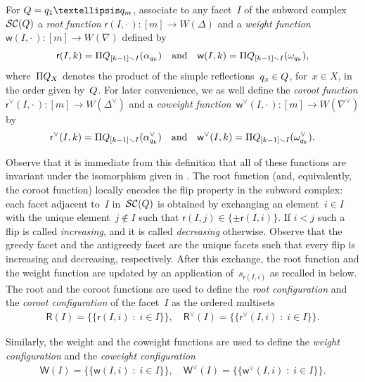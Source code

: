 \documentclass[10pt]{amsart}
\theoremstyle{definition}\newtheorem{rema}[theo]{Remark}\newtheorem{exem}[theo]{Example}
\newcommand{\ssm}{\smallsetminus}
\newcommand{\Dfn}[1]{\emph{#1}}
\newcommand{\subwordComplex}{\mathcal{SC}}
\newcommand{\sq}[1]{{\rm #1}}
\newcommand{\Q}{\sq{Q}}
\newcommand{\q}{\sq{q}}
\newcommand{\sfr}{\mathsf{r}}
\newcommand{\sfR}{\mathsf{R}}
\newcommand{\sfw}{\mathsf{w}}
\newcommand{\sfW}{\mathsf{W}}
\newcommand{\Root}[2]{{\sfr}(#1,#2)}
\newcommand{\Roots}[1]{{\sfR}(#1)}
\newcommand{\Weight}[2]{{\sfw}(#1,#2)}
\newcommand{\Weights}[1]{{\sfW}(#1)}
\newcommand{\coRoot}[2]{{\sfr^\vee}(#1,#2)}
\newcommand{\coRoots}[1]{{\sfR^\vee}(#1)}
\newcommand{\coWeight}[2]{{\sfw^\vee}(#1,#2)}
\newcommand{\coWeights}[1]{{\sfW^\vee}(#1)}
\newcommand{\bigmultiset}[2]{\big\{\!\!\big\{ #1 \;:\; #2 \big\}\!\!\big\}}
\newcommand{\wordprod}[2]{\Pi{#1}_{#2}}
\begin{document}
For $\Q = \q_1 \dots \q_m$, associate to any facet~$I$ of the subword complex~$\subwordComplex(\Q)$ a \Dfn{root function} $\Root{I}{\cdot\,} : [m] \to W(\Delta)$ and a \Dfn{weight function}~$\Weight{I}{\cdot\,} : [m] \to W(\nabla)$ defined by
\[
\Root{I}{k} = \wordprod{\Q}{[k-1] \ssm I}(\alpha_{q_k}) \quad \text{and} \quad \Weight{I}{k} = \wordprod{\Q}{[k-1] \ssm I}(\omega_{q_k}),
\]
where~$\wordprod{\Q}{X}$ denotes the product of the simple reflections~$q_x \in \Q$, for~$x \in X$, in the order given by~$\Q$. For later convenience, we as well define the \Dfn{coroot function} $\coRoot{I}{\cdot\,} : [m] \to W(\Delta^\vee)$ and a \Dfn{coweight function}~$\coWeight{I}{\cdot\,} : [m] \to W(\nabla^\vee)$ by
\[
\coRoot{I}{k} = \wordprod{\Q}{[k-1] \ssm I}(\alpha_{q_k}^\vee) \quad \text{and} \quad \coWeight{I}{k} = \wordprod{\Q}{[k-1] \ssm I}(\omega_{q_k}^\vee).
\]

Observe that it is immediate from this definition that all of these functions are invariant under the isomorphism given in . The root function (and, equivalently, the coroot function) locally encodes the flip property in the subword complex: each facet adjacent to~$I$ in~$\subwordComplex(\Q)$ is obtained by exchanging an element~${i \in I}$ with the unique element~$j \notin I$ such that $\Root{I}{j} \in \{ \pm \Root{I}{i} \}$. If $i < j$ such a flip is called \Dfn{increasing}, and it is called \Dfn{decreasing} otherwise. Observe that the greedy facet and the antigreedy facet are the unique facets such that every flip is increasing and decreasing, respectively. After this exchange, the root function and the weight function are updated by an application of~$s_{\Root{I}{i}}$ as recalled in  below. The root and the coroot functions are used to define the \Dfn{root configuration} and the \Dfn{coroot configuration} of the facet~$I$ as the ordered multisets
\begin{align}
\Roots{I} = \bigmultiset{\Root{I}{i}}{i \in I},\quad \coRoots{I} = \bigmultiset{\coRoot{I}{i}}{i \in I}. \label{eq:rootconfiguration}
\end{align}

Similarly, the weight and the coweight functions are used to define the \Dfn{weight configuration} and the \Dfn{coweight configuration}
\begin{align}
\Weights{I} = \bigmultiset{\Weight{I}{i}}{i \in I},\quad \coWeights{I} = \bigmultiset{\coWeight{I}{i}}{i \in I}. \label{eq:weightconfiguration}
\end{align}
\end{document}
